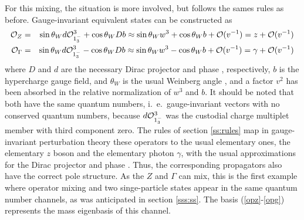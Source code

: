 \documentclass[final,twoside,12pt]{article}
\newcommand*{\no}{\noindent}
\newcommand*{\bea}{\begin{eqnarray}}
\newcommand*{\eea}{\end{eqnarray}}
\newcommand*{\prefr}[2]{(\ref{#1}-\ref{#2})}
\newcommand*{\1}{1\!\!\!\bot}
\newcommand*{\op}{{\cal O}}
\begin{document}
For this mixing, the situation is more involved, but follows the sames rules as before. Gauge-invariant equivalent states can be constructed as
\bea
\op_Z&=&\sin\theta_Wd\op_{1^-_3}^3+\cos\theta_W Db\approx \sin\theta_W w^3+\cos\theta_W b+\op(v^{-1})=z+{\cal O}(v^{-1})\label{opz}\\
\op_\Gamma&=&\sin\theta_Wd\op_{1^-_3}^3-\cos\theta_W Db\approx \sin\theta_W w^3-\cos\theta_W b+\op(v^{-1})=\gamma+{\cal O}(v^{-1})\label{opg}
\eea
\no where $D$ and $d$ are the necessary Dirac projector and phase \cite{Lavelle:1995ty}, respectively, $b$ is the hypercharge gauge field, and $\theta_W$ is the usual Weinberg angle \cite{Bohm:2001yx}, and a factor $v^2$ has been absorbed in the relative normalization of $w^3$ and $b$. It should be noted that both have the same quantum numbers, i.\ e.\ gauge-invariant vectors with no conserved quantum numbers, because $d\op_{1^-_3}^3$ was the custodial charge multiplet member with third component zero. The rules of section \ref{ss:rules} map in gauge-invariant perturbation theory these operators to the usual elementary ones, the elementary $z$ boson and the elementary photon $\gamma$, with the usual approximations for the Dirac projector and phase \cite{Lavelle:1995ty}. Thus, the corresponding propagators also have the correct pole structure. As the $Z$ and $\Gamma$ can mix, this is the first example where operator mixing and two singe-particle states appear in the same quantum number channels, as was anticipated in section \ref{sss:ss}. The basis \prefr{opz}{opg} represents the mass eigenbasis of this channel.
\end{document}
